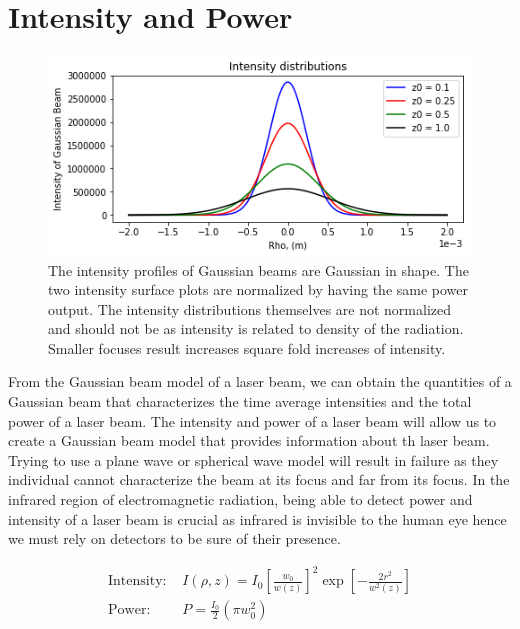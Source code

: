 \documentclass[11pt,a4paper]{book}
\begin{document}
	\section{Intensity and Power}
		\label{sec:Intensity and Power}
		
		\begin{figure} 
		\centering
		\includegraphics[scale=0.8]{images/chapter-3/Intensities_Distribution_beams.png}
		\caption{The intensity profiles of Gaussian beams are Gaussian in shape. The two intensity surface plots are normalized by having the same power output. The intensity distributions themselves are not normalized and should not be as intensity is related to density of the radiation. Smaller focuses result increases square fold increases of intensity.  }
		\label{fig:Intensities_Distribution_beams}
		\end{figure}
	
		From the Gaussian beam model of a laser beam, we can obtain the quantities of a Gaussian beam that characterizes the time average intensities and the total power of a laser beam. The intensity and power of a laser beam will allow us to create a Gaussian beam model that provides information about th laser beam. Trying to use a plane wave or spherical wave model will result in failure as they individual cannot characterize the beam at its focus and far from its focus.  In the infrared region of electromagnetic radiation, being able to detect power and intensity of a laser beam is crucial as infrared is invisible to the human eye hence we must rely on detectors to be sure of their presence.
		
		\begin{equation}
		\label{eq:Intensity and power of Gaussian beam}
		\begin{split}
		\text{Intensity: }& I(\rho, z) = I_0 \left[ \frac{w_0}{w(z)} \right] ^2 \exp{\left[ -\frac{2r^2}{w^2(z)}\right]}\\
		\text{Power: } & P = \frac{I_0}{2} \left(\pi w_0^2\right) \\
		\end{split}
		\end{equation}
		
\end{document}
